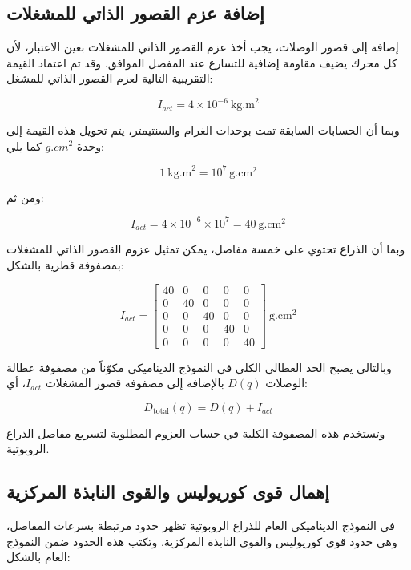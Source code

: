 \subsection{إضافة عزم القصور الذاتي للمشغلات}

إضافة إلى قصور الوصلات، يجب أخذ عزم القصور الذاتي للمشغلات بعين الاعتبار، لأن كل محرك يضيف مقاومة إضافية للتسارع عند المفصل الموافق. وقد تم اعتماد القيمة التقريبية التالية لعزم القصور الذاتي للمشغل:

\[
I_{act}=4\times10^{-6} \ \text{kg.m}^2
\]

وبما أن الحسابات السابقة تمت بوحدات الغرام والسنتيمتر، يتم تحويل هذه القيمة إلى وحدة $g.cm^2$ كما يلي:

\[
1 \ \text{kg.m}^2 = 10^{7} \ \text{g.cm}^2
\]

ومن ثم:

\[
I_{act}
=
4\times10^{-6} \times 10^{7}
=
40 \ \text{g.cm}^2
\]

وبما أن الذراع تحتوي على خمسة مفاصل، يمكن تمثيل عزوم القصور الذاتي للمشغلات بمصفوفة قطرية بالشكل:

\[
I_{act} =
\begin{bmatrix}
40 & 0 & 0 & 0 & 0 \\
0 & 40 & 0 & 0 & 0 \\
0 & 0 & 40 & 0 & 0 \\
0 & 0 & 0 & 40 & 0 \\
0 & 0 & 0 & 0 & 40
\end{bmatrix}
\ \text{g.cm}^2
\]

وبالتالي يصبح الحد العطالي الكلي في النموذج الديناميكي مكوّناً من مصفوفة عطالة الوصلات $D(q)$ بالإضافة إلى مصفوفة قصور المشغلات $I_{act}$، أي:

\[
D_{\text{total}}(q)
=
D(q)+I_{act}
\]

وتستخدم هذه المصفوفة الكلية في حساب العزوم المطلوبة لتسريع مفاصل الذراع الروبوتية.



\subsection{إهمال قوى كوريوليس والقوى النابذة المركزية}

في النموذج الديناميكي العام للذراع الروبوتية تظهر حدود مرتبطة بسرعات المفاصل، وهي حدود قوى كوريوليس والقوى النابذة المركزية. وتكتب هذه الحدود ضمن النموذج العام بالشكل:

